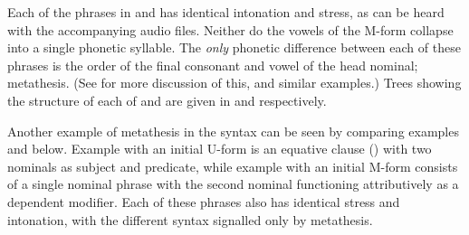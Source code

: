 Each of the phrases in  and 
has identical intonation and stress,
as can be heard with the accompanying audio files.
Neither do the vowels of the M-form collapse into a single phonetic syllable.
The \emph{only} phonetic difference between each of these phrases
is the order of the final consonant and vowel of the head nominal; metathesis.
(See  for more discussion of this, and similar examples.)
Trees showing the structure of each of  and 
are given in  and  respectively.

\begin{multicols}{2}
	\begin{exe}
		\label{tr:NenoMeseq}
		\label{tr:NeonMeseq}
	\end{exe}
\end{multicols}

Another example of metathesis in the syntax
can be seen by comparing examples  and  below.
Example  with an initial U-form is an equative clause
() with two nominals as subject and predicate,
while example  with an initial M-form consists of a single nominal phrase
with the second nominal functioning attributively as a dependent modifier.
Each of these phrases also has identical stress and intonation,
with the different syntax signalled only by metathesis.

\begin{multicols}{2}
	\begin{exe}
		\label{ex:BigSto1}
		\label{ex:BigSto2}
	\end{exe}
\end{multicols}

